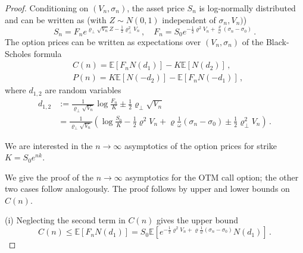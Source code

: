 \documentclass[11pt]{article}
\numberwithin{equation}{section}
\theoremstyle{plain}
\begin{document}
\begin{proof}
Conditioning on $(V_n,\sigma_n)$, the asset price $S_n$ is log-normally 
distributed and can be written as (with $Z\sim N(0,1)$ independent of $\sigma_n,V_n)$)
\begin{equation}\label{Fndef}
S_n=F_n e^{\varrho_\perp \sqrt{V_n} Z - \frac12 \varrho_\perp^2 V_n}\,,\quad
F_n =S_0 e^{-\frac12\varrho^2 V_n + \frac{\varrho}{\omega}(\sigma_n-\sigma_0)}\,.
\end{equation}
The option prices can be written as expectations over $(V_n,\sigma_n)$ of the
Black-Scholes formula
\begin{align}
&C(n) = \mathbb{E}[F_n N(d_1)] - K \mathbb{E}[N(d_2)]\,, \\
&P(n) = K \mathbb{E}[N(-d_2)] - \mathbb{E}[F_n N(-d_1)]\,,
\end{align}
where $d_{1,2}$ are random variables 
\begin{align}
d_{1,2} &:= \frac{1}{\varrho_\perp \sqrt{V_n}} \log \frac{F_n}{K}
\pm \frac12 \varrho_\perp \sqrt{V_n} \\
&=\frac{1}{\varrho_\perp \sqrt{V_n}} \left( \log\frac{S_0}{K}
- \frac12 \varrho^2 V_n + \varrho \frac{1}{\omega} (\sigma_n -\sigma_0)
\pm \frac12 \varrho_\perp^2 V_n \right) \,.\nonumber
\end{align}

We are interested in the $n\to \infty$ asymptotics of the option prices for
strike $K  = S_0 e^{n k}$. 

We give the proof of the $n\to \infty$ asymptotics for the OTM call option;
the other two cases follow analogously. The proof follows by upper and lower 
bounds on $C(n)$.

(i) Neglecting the second term in $C(n)$ gives the upper bound
\begin{equation}
C(n) \leq \mathbb{E}[F_n N(d_1)] = S_0 \mathbb{E}\left[
e^{-\frac12\varrho^2 V_n + \varrho \frac{1}{\omega} (\sigma_n-\sigma_0)}
N(d_1)\right] \,.
\end{equation}


\end{proof}
\end{document}
